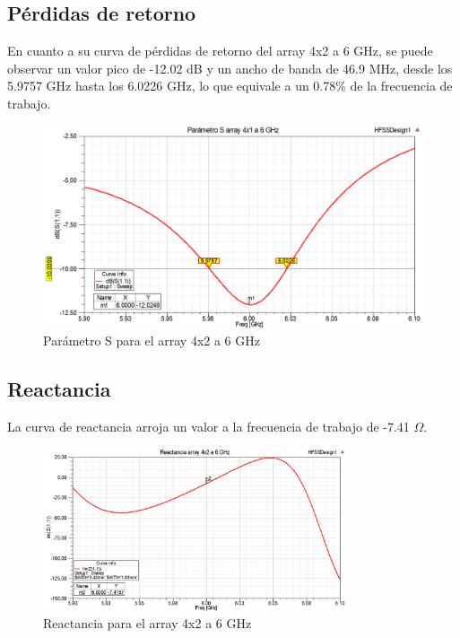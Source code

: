 \subsection{Pérdidas de retorno}
\par En cuanto a su curva de pérdidas de retorno del array 4x2 a 6 GHz, se puede observar un valor pico de -12.02 dB y un ancho de banda de 46.9 MHz, desde los 5.9757 GHz hasta los 6.0226 GHz, lo que equivale a un 0.78\% de la frecuencia de trabajo.
\\
\begin{figure}[H]
    \centering
        \includegraphics[width=\textwidth]{archivos/analisis/4x22/1}
        \caption{Parámetro S para el array 4x2 a 6 GHz}
        \label{fig:s4x22}
\end{figure}

\newpage
\subsection{Reactancia}
\par La curva de reactancia arroja un valor a la frecuencia de trabajo de -7.41 $\Omega$. 
\\
\begin{figure}[H]
    \centering
        \includegraphics[width=0.8\textwidth]{archivos/analisis/4x22/2}
        \caption{Reactancia para el array 4x2 a 6 GHz}
        \label{fig:react4x22}
\end{figure}

